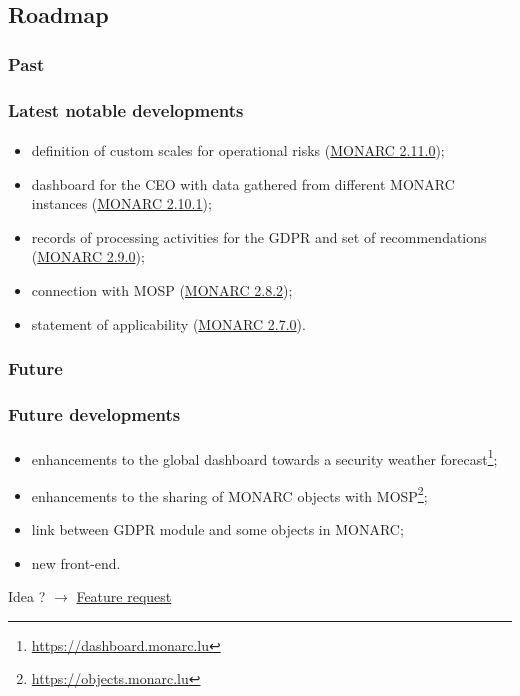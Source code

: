 \subsection{Roadmap}
\subsubsection{Past}
\begin{frame}
  \frametitle{Latest notable developments}
  \framesubtitle{}
  \begin{itemize}
    \item definition of custom scales for operational risks
      (\href{https://www.monarc.lu/news/2021/09/02/monarc-2110-released/}{MONARC 2.11.0});
    \item dashboard for the CEO with data gathered from different MONARC instances
      (\href{https://www.monarc.lu/news/2020/12/18/monarc-2101-released/}{MONARC 2.10.1});
    \item records of processing activities for the GDPR and set of recommendations
      (\href{https://www.monarc.lu/news/2019/08/23/monarc-290-released/}{MONARC 2.9.0});
    \item connection with MOSP
      (\href{https://www.monarc.lu/news/2019/05/28/monarc-282-released/}{MONARC 2.8.2});
    \item statement of applicability
      (\href{https://www.monarc.lu/news/2018/08/22/monarc-270-released/}{MONARC 2.7.0}).
  \end{itemize}
\end{frame}

\subsubsection{Future}
\begin{frame}
  \frametitle{Future developments}
  \framesubtitle{}
  \begin{itemize}
    \item enhancements to the global dashboard towards a
    security weather forecast\footnote{\url{https://dashboard.monarc.lu}};
    \item enhancements to the sharing of MONARC objects with
    MOSP\footnote{\url{https://objects.monarc.lu}};
    \item link between GDPR module and some objects in MONARC;
    \item new front-end.
  \end{itemize}
  \bigskip
  Idea ?
  $\rightarrow$
  \href{https://github.com/monarc-project/MonarcAppFO/issues/new?labels=feature+request}{Feature request}
\end{frame}
